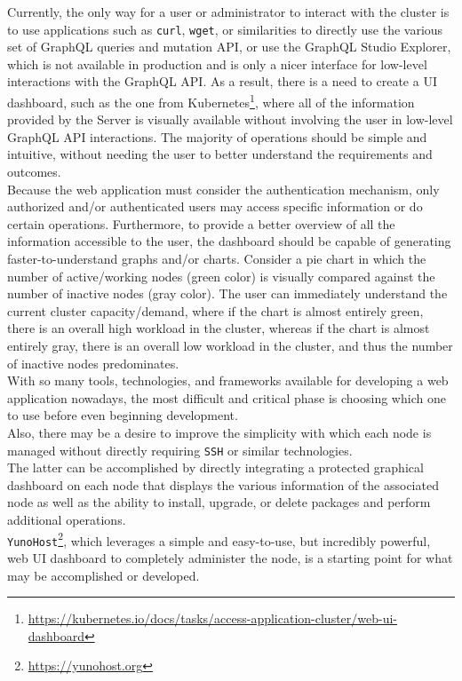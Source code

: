 Currently, the only way for a user or administrator to interact with the cluster
is to use applications such as \texttt{curl}, \texttt{wget}, or similarities to directly
use the various set of GraphQL queries and mutation API, or use the GraphQL
Studio Explorer, which is not available in production and is only a nicer interface
for low-level interactions with the GraphQL API. As a result, there is a need to
create a UI dashboard, such as the one from Kubernetes\footnote{\url{https://kubernetes.io/docs/tasks/access-application-cluster/web-ui-dashboard}},
where all of the information provided by the Server is visually available without
involving the user in low-level GraphQL API interactions. The majority of
operations should be simple and intuitive, without needing the user to better understand
the requirements and outcomes. \\ %
Because the web application must consider the authentication mechanism, only
authorized and/or authenticated users may access specific information or do
certain operations. Furthermore, to provide a better overview of all the
information accessible to the user, the dashboard should be capable of generating
faster-to-understand graphs and/or charts. Consider a pie chart in which the
number of active/working nodes (green color) is visually compared against the
number of inactive nodes (gray color). The user can immediately understand the current
cluster capacity/demand, where if the chart is almost entirely green, there is an
overall high workload in the cluster, whereas if the chart is almost entirely
gray, there is an overall low workload in the cluster, and thus the number of
inactive nodes predominates. \\ %
With so many tools, technologies, and frameworks available for developing a web
application nowadays, the most difficult and critical phase is choosing which one
to use before even beginning development. \\ %

Also, there may be a desire to improve the simplicity with which each node is managed
without directly requiring \texttt{SSH} or similar technologies. \\ %
The latter can be accomplished by directly integrating a protected graphical
dashboard on each node that displays the various information of the associated
node as well as the ability to install, upgrade, or delete packages and perform
additional operations. \\ %
\texttt{YunoHost}\footnote{\url{https://yunohost.org}}, which leverages a simple
and easy-to-use, but incredibly powerful, web UI dashboard to completely
administer the node, is a starting point for what may be accomplished or developed.

